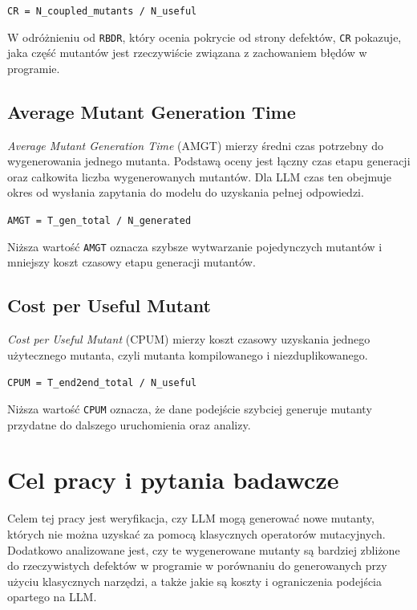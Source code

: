 \documentclass[12pt,a4paper,oldfontcommands]{memoir}
\theoremstyle{plain}
\theoremstyle{definition}
\theoremstyle{remark}
\begin{document}
    \begin{center}
        \texttt{CR = N\_coupled\_mutants / N\_useful}
    \end{center}

    W odróżnieniu od \texttt{RBDR}, który ocenia pokrycie od strony defektów, \texttt{CR} pokazuje, jaka część mutantów jest rzeczywiście związana z zachowaniem błędów w programie.

    \subsection{Average Mutant Generation Time}

    \textit{Average Mutant Generation Time} (AMGT) mierzy średni czas potrzebny do wygenerowania jednego mutanta.
    Podstawą oceny jest łączny czas etapu generacji oraz całkowita liczba wygenerowanych mutantów.
    Dla LLM czas ten obejmuje okres od wysłania zapytania do modelu do uzyskania pełnej odpowiedzi.

    \begin{center}
        \texttt{AMGT = T\_gen\_total / N\_generated}
    \end{center}

    Niższa wartość \texttt{AMGT} oznacza szybsze wytwarzanie pojedynczych mutantów i mniejszy koszt czasowy etapu generacji mutantów.

    \subsection{Cost per Useful Mutant}

    \textit{Cost per Useful Mutant} (CPUM) mierzy koszt czasowy uzyskania jednego użytecznego mutanta, czyli mutanta kompilowanego i niezduplikowanego.

    \begin{center}
        \texttt{CPUM = T\_end2end\_total / N\_useful}
    \end{center}

    Niższa wartość \texttt{CPUM} oznacza, że dane podejście szybciej generuje mutanty przydatne do dalszego uruchomienia oraz analizy.

    \section{Cel pracy i pytania badawcze}

    Celem tej pracy jest weryfikacja, czy LLM mogą generować nowe mutanty, których nie można uzyskać za pomocą klasycznych operatorów mutacyjnych.
    Dodatkowo analizowane jest, czy te wygenerowane mutanty są bardziej zbliżone do rzeczywistych defektów w programie w porównaniu do generowanych przy użyciu klasycznych narzędzi, a także jakie są koszty i ograniczenia podejścia opartego na LLM.
\end{document}
